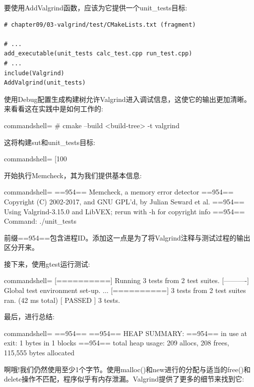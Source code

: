 要使用AddValgrind函数，应该为它提供一个unit\_tests目标:

\begin{lstlisting}[style=styleCMake]
# chapter09/03-valgrind/test/CMakeLists.txt (fragment)

# ...
add_executable(unit_tests calc_test.cpp run_test.cpp)
# ...
include(Valgrind)
AddValgrind(unit_tests)
\end{lstlisting}

使用Debug配置生成构建树允许Valgrind进入调试信息，这使它的输出更加清晰。来看看这在实践中是如何工作的:

\begin{tcblisting}{commandshell={}}
# cmake --build <build-tree> -t valgrind
\end{tcblisting}

这将构建sut和unit\_tests目标:

\begin{tcblisting}{commandshell={}}
[100%
\end{tcblisting}

开始执行Memcheck，其为我们提供基本信息:

\begin{tcblisting}{commandshell={}}
==954== Memcheck, a memory error detector
==954== Copyright (C) 2002-2017, and GNU GPL'd, by Julian
Seward et al.
==954== Using Valgrind-3.15.0 and LibVEX; rerun with -h for
copyright info
==954== Command: ./unit_tests
\end{tcblisting}

前缀==954==包含进程ID。添加这一点是为了将Valgrind注释与测试过程的输出区分开来。

接下来，使用gtest运行测试:

\begin{tcblisting}{commandshell={}}
[==========] Running 3 tests from 2 test suites.
[----------] Global test environment set-up.
...
[==========] 3 tests from 2 test suites ran. (42 ms total)
[ PASSED ] 3 tests.
\end{tcblisting}

最后，进行总结:

\begin{tcblisting}{commandshell={}}
==954==
==954== HEAP SUMMARY:
==954== in use at exit: 1 bytes in 1 blocks
==954== total heap usage: 209 allocs, 208 frees, 115,555
bytes allocated
\end{tcblisting}

啊哦!我们仍然使用至少1个字节。使用malloc()和new进行的分配与适当的free()和delete操作不匹配，程序似乎有内存泄漏。Valgrind提供了更多的细节来找到它:


